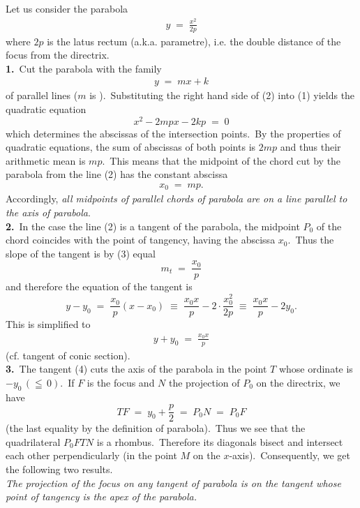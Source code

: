 \documentclass[12pt]{article}
\begin{document}
Let us consider the parabola
\begin{align}
y \;=\; \frac{x^2}{2p}
\end{align}
where $2p$ is the latus rectum (a.k.a. parametre), i.e. the double distance of the focus from the directrix.\\

\textbf{1.}\, Cut the parabola with the family
\begin{align}
y \;=\; mx\!+\!k
\end{align}
of parallel lines ($m$ is ).\, Substituting the right hand side of (2) into (1) yields the quadratic equation
$$x^2-2mpx-2kp \;=\; 0$$
which determines the abscissas of the intersection points.\, By the properties of quadratic equations, the sum of abscissas of both points is $2mp$ and thus their arithmetic mean is $mp$.\, This means that the midpoint of the chord cut by the parabola from the line (2) has the constant abscissa
\begin{align}
x_0 \;=\; mp.
\end{align}
Accordingly, \emph{all midpoints of parallel chords of parabola are on a line parallel to the axis of parabola}.\\

\textbf{2.}\, In the case the line (2) is a tangent of the parabola, the midpoint $P_0$ of the chord coincides with the point of tangency, having the abscissa $x_0$.\, Thus the slope of the tangent is by (3) equal
$$m_t \;=\; \frac{x_0}{p}$$
and therefore the equation of the tangent is
$$y\!-\!y_0 \;=\; \frac{x_0}{p}(x\!-\!x_0) \;\equiv\; \frac{x_0x}{p}-2\!\cdot\!\frac{x_0^2}{2p} 
\;\equiv\; \frac{x_0x}{p}-2y_0.$$
This is simplified to
\begin{align}
y\!+\!y_0 \;=\; \frac{x_0x}{p}
\end{align}
(cf. tangent of conic section).\\


\textbf{3.}\, The tangent (4) cuts the axis of the parabola in the point $T$ whose ordinate is $-y_0\,(\leqq\, 0)$.\, If 
$F$ is the focus and $N$ the projection of $P_0$ on the directrix, we have
$$TF \;=\; y_0+\frac{p}{2} \;=\; P_0N \;=\; P_0F$$
(the last equality by the definition of parabola).\, Thus we see that the quadrilateral $P_0FTN$ is a rhombus.\, Therefore its diagonals bisect and intersect each other perpendicularly (in the point $M$ on the $x$-axis).\, Consequently, we get the following two results.\\

\emph{The projection of the focus on any tangent of parabola is on the tangent whose point of tangency is the apex of the parabola.}\\
\end{document}
